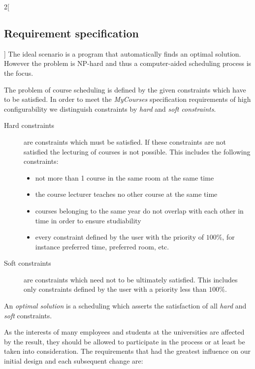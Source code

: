 \begin{multicols}{2}[\subsection{Requirement specification}]
\label{sec:requirement-specification}
The ideal scenario is a program that automatically finds an optimal solution. However the problem is NP-hard \cite{JSSP} and thus a computer-aided scheduling process is the focus.

The problem of course scheduling is defined by the given constraints which have to be satisfied. In order to meet the \emph{MyCourses} specification requirements of high configurability we distinguish constraints by \emph{hard} and \emph{soft constraints}.

\begin{description}
\item[Hard constraints] are constraints which must be satisfied. If these constraints are not satisfied the lecturing of courses is not possible. This includes the following constraints:

\begin{itemize}
\item not more than 1 course in the same room at the same time

\item the course lecturer teaches no other course at the same time

\item courses belonging to the same year do not overlap with each other in time in order to ensure studiability

\item every constraint defined by the user with the priority of $100\%$, for instance preferred time, preferred room, etc.
\end{itemize}

\item[Soft constraints] are constraints which need not to be ultimately satisfied. This includes only constraints defined by the user with a priority less than $100\%$.
\end{description}

An \emph{optimal solution} is a scheduling which asserts the satisfaction of all \emph{hard} and \emph{soft} constraints.


As the interests of many employees and students at the universities are affected by the result, they should be allowed to participate in the process or at least be taken into consideration. The requirements that had the greatest influence on our initial design and each subsequent change are:


\end{multicols}
